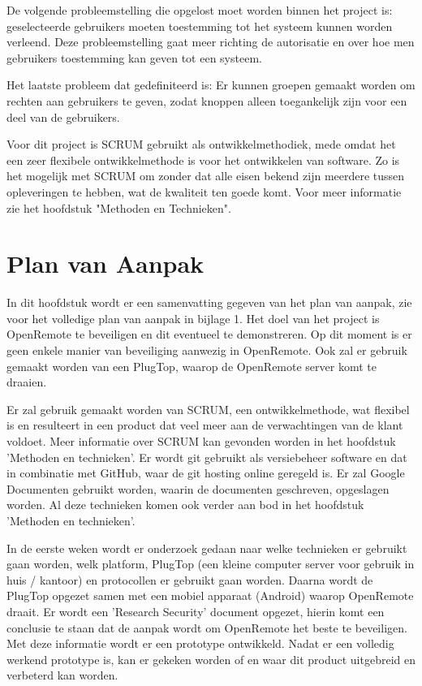 \documentclass[]{article}
\begin{document}
De volgende probleemstelling die opgelost moet worden binnen het project
is: geselecteerde gebruikers moeten toestemming tot het systeem kunnen worden
verleend. Deze probleemstelling gaat meer richting de autorisatie en over
hoe men gebruikers toestemming kan geven tot een systeem.

Het laatste probleem dat gedefiniteerd is: Er kunnen groepen gemaakt worden om
rechten aan gebruikers te geven, zodat knoppen alleen toegankelijk zijn voor een deel van de gebruikers. 

Voor dit project is SCRUM gebruikt als ontwikkelmethodiek, mede omdat het een
zeer flexibele ontwikkelmethode is voor het ontwikkelen van software. Zo is het
mogelijk met SCRUM om zonder dat alle eisen bekend zijn meerdere tussen
opleveringen te hebben, wat de kwaliteit ten goede komt. Voor meer
informatie zie het hoofdstuk "Methoden en Technieken".

\newpage
\section{Plan van Aanpak}

In dit hoofdstuk wordt er een samenvatting gegeven van het plan van aanpak,
zie voor het volledige plan van aanpak in bijlage 1. Het doel van het 
project is OpenRemote  te  beveiligen  en  dit  eventueel  te
demonstreren. Op dit moment is er geen enkele manier van beveiliging aanwezig
in OpenRemote. Ook zal er gebruik gemaakt worden van een PlugTop, waarop  de
OpenRemote server komt te draaien.

Er zal gebruik gemaakt worden van  SCRUM, een ontwikkelmethode, wat flexibel is en resulteert in een product dat  veel
meer aan de verwachtingen van de klant voldoet. Meer informatie  over  SCRUM
kan gevonden worden in het hoofdstuk 'Methoden en technieken'.
Er wordt git gebruikt als versiebeheer software en  dat  in  combinatie  met
GitHub, waar de git hosting online geregeld is.  Er  zal  Google  Documenten
gebruikt worden, waarin de documenten geschreven, opgeslagen worden.
Al deze technieken komen ook verder aan bod in het  hoofdstuk  'Methoden  en
technieken'.

In de eerste weken wordt  er  onderzoek  gedaan  naar  welke  technieken  er
gebruikt gaan worden, welk platform,  PlugTop (een kleine computer server voor gebruik in huis / kantoor)  en  protocollen  er  gebruikt
gaan worden. Daarna wordt de PlugTop opgezet samen met een  mobiel  apparaat
(Android)  waarop  OpenRemote  draait. Er wordt een 'Research  Security'
document opgezet, hierin komt een conclusie te staan dat de aanpak wordt  om
OpenRemote het beste  te  beveiligen.  Met  deze  informatie  wordt  er  een
prototype ontwikkeld. Nadat er een volledig werkend  prototype  is,  kan  er
gekeken worden of en waar dit product uitgebreid en verbeterd kan worden.
\end{document}

